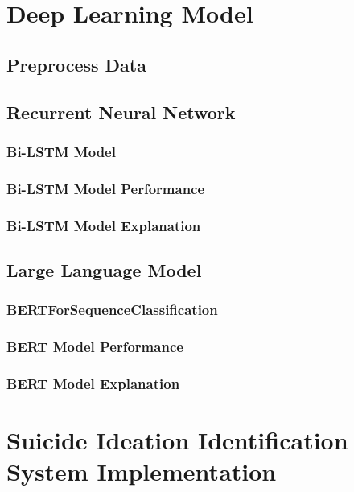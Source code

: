 \documentclass[ %
                    author={Louis Wang},
                supervisor={Dr. Qiang Liu},
                    degree={MSc},
                     title={Identification of Suicide Ideation in Texts},
                      type={},
                      year={2024}]{dissertation}
\begin{document}
\chapter{Deep Learning Model}
\label{chap:execution2}

\section{Preprocess Data}

\section{Recurrent Neural Network}

\subsection{Bi-LSTM Model}

\subsection{Bi-LSTM Model Performance}

\subsection{Bi-LSTM Model Explanation}

\section{Large Language Model}

\subsection{BERTForSequenceClassification}

\subsection{BERT Model Performance}

\subsection{BERT Model Explanation}


\chapter{Suicide Ideation Identification System Implementation}
\label{chap:implementation}
\end{document}
